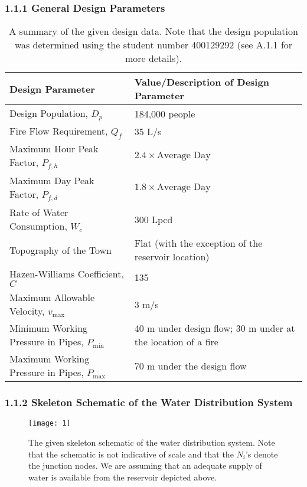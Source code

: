 \documentclass[]{article}
\begin{document}
	\subsubsection{1.1.1 General Design Parameters}
	\begin{table}[H]
		\centering
		\begin{tabular}{|M{7 cm}|M{8.5cm}|}
			\hline
			 Design Parameter &  Value/Description of Design Parameter \\ \hline
			Design Population, $D_{{p}}$  & 184,000 people \\ \hline
			Fire Flow Requirement, $Q_{{f}}$ & 35 L/s \\ \hline
			Maximum Hour Peak Factor, $P_{{f,h}}$ &  $2.4 \times \text{Average Day}$  \\ \hline
			Maximum Day Peak Factor, $P_{{f,d}}$ & $1.8 \times \text{Average Day}$ \\ \hline
			Rate of Water Consumption, $W_c$ & 300 Lpcd   \\ \hline
			Topography of the Town & Flat (with the exception of the reservoir location) \\ \hline
			Hazen-Williams Coefficient, $C$ & 135 \\ \hline
			Maximum Allowable Velocity, $v_{\text{max}}$ & 3 m/s \\ \hline
			Minimum Working Pressure in Pipes, $P_{\text{min}}$ & 40 m under design flow; 30 m under at the location of a fire \\ \hline
			Maximum Working Pressure in Pipes, $P_{\text{max}}$ & 70 m under the design flow \\ \hline
		\end{tabular}
		\caption[Given Design Data]{A summary of the given design data. Note that the design population was determined using the student number 400129292 (see A.1.1 for more details).}
	\end{table}
	\subsubsection{1.1.2 Skeleton Schematic of the Water Distribution System}
	\begin{figure}[H]
		\centering
		\texttt{[image: 1]}
		\caption[Given Skeleton Schematic of the Water Distribution System]{The given skeleton schematic of the water distribution system. Note that the schematic is not indicative of scale and that the $N_i$'s denote the junction nodes. We are assuming that an adequate supply of water is available from the reservoir depicted above.}
	\end{figure} 
\end{document}
